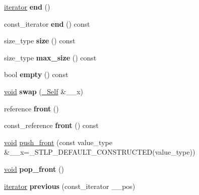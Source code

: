 \begin{DoxyCompactItemize}
\mbox{\label{classslist_a1297a8893ee7d714abffb8908fbf1aed}} 
\hyperlink{structiterator}{iterator} {\bfseries end} ()
\item 
\mbox{\label{classslist_a065e80e73715daef372a1cc38ac7c2d4}} 
const\+\_\+iterator {\bfseries end} () const
\item 
\mbox{\label{classslist_a45de1df63fad9e19bc251e872e71db29}} 
size\+\_\+type {\bfseries size} () const
\item 
\mbox{\label{classslist_a5bb3af824c80a5ad9669af7d28dc64a2}} 
size\+\_\+type {\bfseries max\+\_\+size} () const
\item 
\mbox{\label{classslist_accbdbeca5e98ff3bee44b0476f423c4c}} 
bool {\bfseries empty} () const
\item 
\mbox{\label{classslist_a0690c1e87951ec400f4cfbc95ef4cd3c}} 
\hyperlink{interfacevoid}{void} {\bfseries swap} (\hyperlink{classslist}{\+\_\+\+Self} \&\+\_\+\+\_\+x)
\item 
\mbox{\label{classslist_aaa960fb7e240e1fed96ce790d2e4cf8d}} 
reference {\bfseries front} ()
\item 
\mbox{\label{classslist_a5c191555457df3d83234351b75aa1bb7}} 
const\+\_\+reference {\bfseries front} () const
\item 
\hyperlink{interfacevoid}{void} \hyperlink{classslist_a78626cbca107457f6be0e5ef5def06bb}{push\+\_\+front} (const value\+\_\+type \&\+\_\+\+\_\+x=\+\_\+\+S\+T\+L\+P\+\_\+\+D\+E\+F\+A\+U\+L\+T\+\_\+\+C\+O\+N\+S\+T\+R\+U\+C\+T\+ED(value\+\_\+type))
\item 
\mbox{\label{classslist_ab746dd98195870a8b229ee4213d11a07}} 
\hyperlink{interfacevoid}{void} {\bfseries pop\+\_\+front} ()
\item 
\mbox{\label{classslist_af2814f2581be6b2174cfe7b83281537c}} 
\hyperlink{structiterator}{iterator} {\bfseries previous} (const\+\_\+iterator \+\_\+\+\_\+pos)
\item 
\mbox{\label{classslist_af4ed2e438e231f0750e84f29b943d7a6}} 

\end{DoxyCompactItemize}
